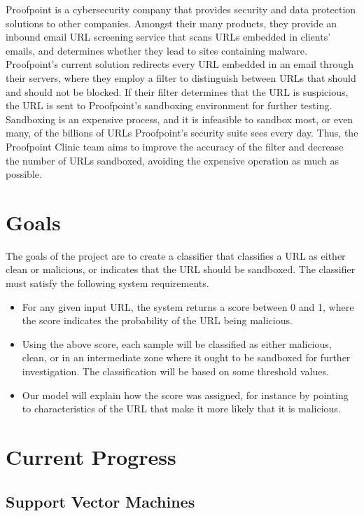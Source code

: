 \documentclass[cs,midyearupdate]{hmcclinic}
\begin{document}
Proofpoint is a cybersecurity company that provides security and data protection solutions to other companies. Amongst their many products, they provide an inbound email URL screening service that scans URLs embedded in clients' emails, and determines whether they lead to sites containing malware. Proofpoint's current solution redirects every URL embedded in an email through their servers, where they employ a filter to distinguish between URLs that should and should not be blocked. If their filter determines that the URL is suspicious, the URL is sent to Proofpoint's sandboxing environment for further testing. Sandboxing is an expensive process, and it is infeasible to sandbox most, or even many, of the billions of URLs Proofpoint's security suite sees every day. Thus, the Proofpoint Clinic team aims to improve the accuracy of the filter and decrease the number of URLs sandboxed, avoiding the expensive operation as much as possible.


\section{Goals}

The goals of the project are to create a classifier that classifies a URL as either clean or malicious, or indicates that the URL should be sandboxed. The classifier must satisfy the following system requirements.

\begin{itemize} \itemsep0em
\item For any given input URL, the system returns a score between 0 and 1, where the score indicates the probability of the URL being malicious.
\item Using the above score, each sample will be classified as either malicious, clean, or in an intermediate zone where it ought to be sandboxed for further investigation. The classification will be based on some threshold values.
\item Our model will explain how the score was assigned, for instance by pointing to characteristics of the URL that make it more likely that it is malicious.
\end{itemize}


\section{Current Progress}

\subsection{Support Vector Machines}
\end{document}
